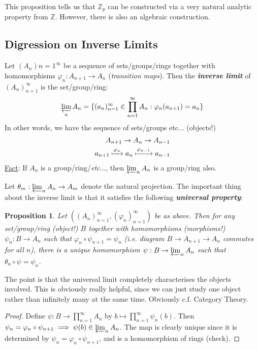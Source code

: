 \documentclass[]{article}
\theoremstyle{custhm}
\theoremstyle{cusdef}
\theoremstyle{custhm}
\theoremstyle{custhm}
\theoremstyle{custhm}
\newtheorem{prop}[theorem]{Proposition}
\theoremstyle{custhm}
\theoremstyle{cusdef}
\theoremstyle{remark}
\newcommand{\Z}{\mathbb{Z}}
\newcommand{\ra}{\rightarrow}
\newcommand{\undf}[1]{\textit{\textbf{#1}}}
\renewcommand{\it}[1]{\textit{#1}}
\renewcommand{\phi}{\varphi}
\begin{document}
This proposition tells us that $\Z_p$ can be constructed via a very natural analytic property from $\Z$. However, there is also an algebraic construction.

\subsection*{Digression on Inverse Limits}

Let $(A_n){n=1}^{\infty}$ be a sequence of sets/groups/rings together with homomorphisms $\phi_n : A_{n+1}\ra A_n$ (\it{transition maps}). Then the \undf{inverse limit} of $(A_n)_{n=1}^{\infty}$ is the set/group/ring:
\begin{align*}
\varprojlim_nA_n = \{(a_n)_{n=1}^{\infty}\in \prod_{n=1}^{\infty}A_n : \phi_n(a_{n+1}) = a_n\}
\end{align*}
In other words, we have the sequence of sets/groups etc... (objects!)
\begin{align*}
A_{n+1}\ra A_n\ra A_{n-1}\\
a_{n+1}\xmapsto{\phi_n}a_n\xmapsto{\phi_{n-1}}a_{n-1}
\end{align*}
\underline{Fact}: If $A_n$ is a group/ring/\it{etc}..., then $\varprojlim_n A_n$ is a group/ring also.

Let $\theta_m : \varprojlim_nA_n\ra A_m$ denote the natural projection. The important thing about the inverse limit is that it satisfies the following \undf{universal property}:

\begin{prop}
Let $((A_n)_{n=1}^{\infty},(\phi_n)_{n=1}^{\infty})$ be as above. Then for any set/group/ring (object!) $B$ together with homomorphisms (morphisms!) $\psi_n:B\ra A_n$ such that $\phi_n\circ\psi_{n+1} = \psi_n$ (\it{i.e.} diagram $B\ra A_{n+1}\ra A_n$ commutes for all $n$), there is a unique homomorphism $\psi: B\ra\varprojlim_n A_n$ such that $\theta_n\circ\psi = \psi_n$.
\end{prop}

The point is that the universal limit completely characterises the objects involved. This is obviously really helpful, since we can just study one object rather than infinitely many at the same time. Obviously \textrm{c.f.} Category Theory.

\begin{proof}
Define $\psi : B\ra \prod_{n=1}^{\infty}A_n$ by $b\mapsto \prod_{n=1}^{\infty}\psi_n(b)$. Then $\psi_n = \phi_n\circ \psi_{n+1} \implies \psi(b)\in \varprojlim_n A_n$. The map is clearly unique since it is determined by $\psi_n  = \phi_n \circ \psi_{n+1}$, and is a homomorphism of rings (check).
\end{proof}
\end{document}
